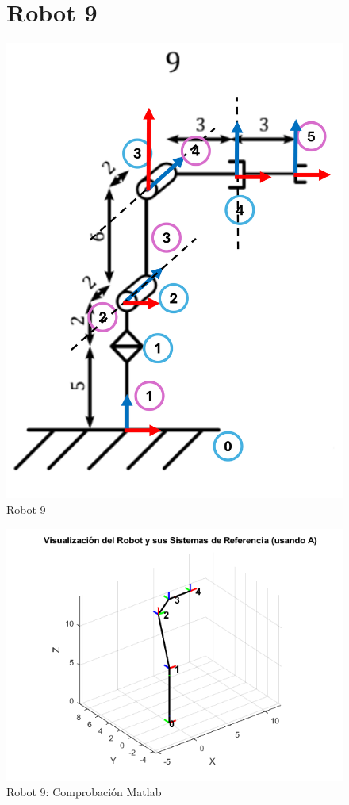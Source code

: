 \begin{figure}[h]
	\section{Robot 9}
	\centering
	{%
		\includegraphics[width=0.5\linewidth]{img/Robot9_1}
		\caption{Robot 9}
		\label{fig:robot91}
	}
\end{figure}
\begin{figure}[h]
	\centering
	{%
		\includegraphics[width=0.7\linewidth]{img/Robot9}
		\caption{Robot 9: Comprobación Matlab}
		\label{fig:robot9}
	}
\end{figure}